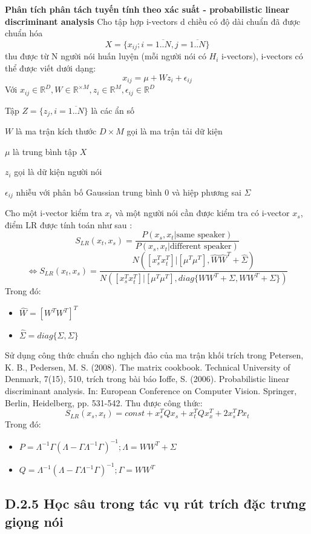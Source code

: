 \documentclass{article}
\begin{document}
	\textbf{Phân tích phân tách tuyến tính theo xác suất - probabilistic linear discriminant analysis}
	Cho tập hợp i-vectors d chiều có độ dài chuẩn đã được chuẩn hóa 
	$$X = \{x_{ij}; i = \overline{1..N}, j = \overline{1..N}\}$$ thu được từ N người nói huấn luyện (mỗi người nói có $H_{i}$ i-vectors), i-vectors có thể được viết dưới dạng:
	$$x_{ij} = \mu + Wz_{i} + \epsilon_{ij}$$
	Với $x_{ij} \in \mathbb{R}^{D}, W \in \mathbb{R}^{ \times M}, z_{i} \in \mathbb{R}^{M}, \epsilon_{ij} \in \mathbb{R}^{D}$
	
	Tập $Z=\{z_{j}, i = \overline{1..N}\}$ là các ẩn số
	
	$W$ là ma trận kích thước $D \times M$ gọi là ma trận tải dữ kiện
	
	$\mu$ là trung bình tập $X$
	
	$z_{i}$ gọi là dữ kiện người nói
	
	$\epsilon_{ij}$ nhiễu với phân bố Gaussian trung bình 0 và hiệp phương sai $\Sigma$
	
	Cho một i-vector kiểm tra $x_t$ và một người nói cần được kiểm tra có i-vector $x_s$, điểm LR được tính toán như sau :
	$$S_{LR}(x_t, x_s) = \frac{P(x_s, x_t|\text{same speaker})}{P(x_s, x_t|\text{different speaker})}$$
	$$\Leftrightarrow S_{LR}(x_t, x_s) = 
	\frac{N([x_s^Tx_t^T]|[\mu^T\mu^T], \hat{W}\hat{W}^T + \hat{\Sigma})}{N([x_s^Tx_t^T]|[\mu^T\mu^T],diag\{WW^T+\Sigma, WW^T+\Sigma\})}$$
	Trong đó:
	\begin{itemize}
		\item $\hat{W} = [W^TW^T]^T$
		\item $\hat{\Sigma}=diag\{\Sigma,\Sigma\}$
	\end{itemize}
	Sử dụng công thức chuẩn cho nghịch đảo của ma trận khối trích trong Petersen, K. B., Pedersen, M. S. (2008). The matrix cookbook.
	Technical University of Denmark, 7(15), 510, trích trong bài báo Ioffe, S. (2006). Probabilistic linear discriminant analysis. In:
	European Conference on Computer Vision. Springer, Berlin,
	Heidelberg, pp. 531-542. Thu được công thức: 
	$$S_{LR}(x_s, x_t) = const + x_s^TQx_s + x_t^TQx_x^T + 2x_s^TPx_t$$
	Trong đó: 
	\begin{itemize}
		\item $P = \Lambda ^{-1}\Gamma(\Lambda - \Gamma\Lambda^{-1}\Gamma)^{-1};\Lambda=WW^T+\Sigma$
		\item $Q = \Lambda ^{-1}(\Lambda - \Gamma\Lambda^{-1}\Gamma)^{-1};\Gamma=WW^T$
	\end{itemize}
	
	
	\subsection{D.2.5 Học sâu trong tác vụ rút trích đặc trưng giọng nói}
\end{document}
